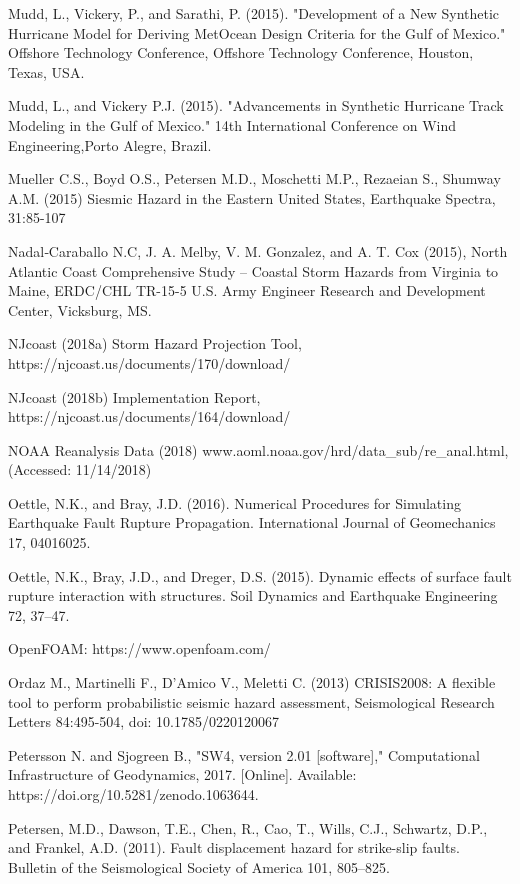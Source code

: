 Mudd, L., Vickery, P., and Sarathi, P. (2015). "Development of a New Synthetic Hurricane Model for Deriving MetOcean Design Criteria for the Gulf of Mexico." Offshore Technology Conference, Offshore Technology Conference, Houston, Texas, USA.

Mudd, L., and Vickery P.J. (2015). "Advancements in Synthetic Hurricane Track Modeling in the Gulf of Mexico." 14th International Conference on Wind Engineering,Porto Alegre, Brazil.

Mueller C.S., Boyd O.S., Petersen M.D., Moschetti M.P., Rezaeian S., Shumway A.M. (2015) Siesmic Hazard in the Eastern United States, Earthquake Spectra, 31:85-107

Nadal‐Caraballo N.C, J. A. Melby, V. M. Gonzalez, and A. T. Cox (2015), North Atlantic Coast Comprehensive Study – Coastal Storm Hazards from Virginia to Maine, ERDC/CHL TR-15-5 U.S. Army Engineer Research and Development Center, Vicksburg, MS.

NJcoast (2018a) Storm Hazard Projection Tool, https://njcoast.us/documents/170/download/ 

NJcoast (2018b) Implementation Report, https://njcoast.us/documents/164/download/ 

NOAA Reanalysis Data (2018) www.aoml.noaa.gov/hrd/data_sub/re_anal.html, (Accessed: 11/14/2018)

Oettle, N.K., and Bray, J.D. (2016). Numerical Procedures for Simulating Earthquake Fault Rupture Propagation. International Journal of Geomechanics 17, 04016025.

Oettle, N.K., Bray, J.D., and Dreger, D.S. (2015). Dynamic effects of surface fault rupture interaction with structures. Soil Dynamics and Earthquake Engineering 72, 37–47.

OpenFOAM: https://www.openfoam.com/

Ordaz M., Martinelli F., D’Amico V., Meletti C. (2013) CRISIS2008: A flexible tool to perform probabilistic seismic hazard assessment, Seismological Research Letters 84:495-504, doi: 10.1785/0220120067

Petersson N. and Sjogreen B., "SW4, version 2.01 [software]," Computational Infrastructure of Geodynamics, 2017. [Online]. Available: https://doi.org/10.5281/zenodo.1063644.

Petersen, M.D., Dawson, T.E., Chen, R., Cao, T., Wills, C.J., Schwartz, D.P., and Frankel, A.D. (2011). Fault displacement hazard for strike-slip faults. Bulletin of the Seismological Society of America 101, 805–825.

